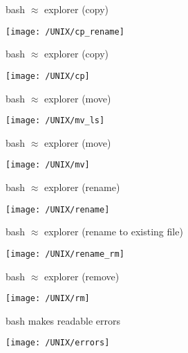 \documentclass[xcolor=dvipsnames]{beamer}
\begin{document}
\begin{frame}
	bash $\approx$ explorer (copy)
	\begin{center}
		\texttt{[image: /UNIX/cp\_rename]}
	\end{center}
\end{frame}

\begin{frame}
	bash $\approx$ explorer (copy)
	\begin{center}
		\texttt{[image: /UNIX/cp]}
	\end{center}
\end{frame}

\begin{frame}
	bash $\approx$ explorer (move)
	\begin{center}
		\texttt{[image: /UNIX/mv\_ls]}
	\end{center}
\end{frame}

\begin{frame}
	bash $\approx$ explorer (move)
	\begin{center}
		\texttt{[image: /UNIX/mv]}
	\end{center}
\end{frame}

\begin{frame}
	bash $\approx$ explorer (rename)
	\begin{center}
		\texttt{[image: /UNIX/rename]}
	\end{center}
\end{frame}

\begin{frame}
	bash $\approx$ explorer (rename to existing file)
	\begin{center}
		\texttt{[image: /UNIX/rename\_rm]}
	\end{center}
\end{frame}

\begin{frame}
	bash $\approx$ explorer (remove)
	\begin{center}
		\texttt{[image: /UNIX/rm]}
	\end{center}
\end{frame}

\begin{frame}
	bash makes readable errors
	\begin{center}
		\texttt{[image: /UNIX/errors]}
	\end{center}
\end{frame}
\end{document}
